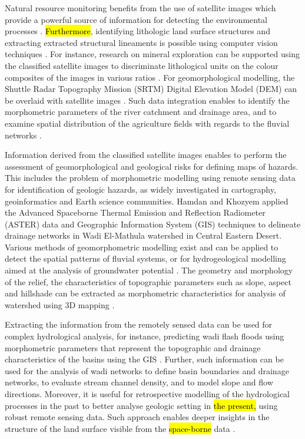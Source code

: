\documentclass[information,article,submit,pdftex,moreauthors]{Definitions/mdpi}
\begin{document}
Natural resource monitoring benefits from the use of satellite images which provide a powerful source of information for detecting the environmental processes \cite{Khafagy}. \hl{Furthermore}, identifying lithologic land surface structures and extracting extracted structural lineaments is possible using computer vision techniques \cite{Bishta,Kusky,Salman}. For instance, research on mineral exploration can be supported using the classified satellite images to discriminate lithological units on the colour composites of the images in various ratios \cite{Shalaby}. For geomorphological modelling, the Shuttle Radar Topography Mission (SRTM) Digital Elevation Model (DEM) can be overlaid with satellite images \cite{Liping}. Such data integration enables to identify the morphometric parameters of the river catchment and drainage area, and to examine spatial distribution of the agriculture fields with regards to the fluvial networks \cite{6265340}. 

Information derived from the classified satellite images enables to perform the assessment of geomorphological and geological risks for defining maps of hazards. This includes the problem of morphometric modelling using remote sensing data for identification of geologic hazards, as widely investigated in cartography, geoinformatics and Earth science communities. Hamdan and Khozyem \cite{Hamdan} applied the Advanced Spaceborne Thermal Emission and Reflection Radiometer (ASTER) data and Geographic Information System (GIS) techniques to delineate drainage networks in Wadi El-Mathula watershed in Central Eastern Desert. Various methods of geomorphometric modelling exist and can be applied to detect the spatial patterns of fluvial systems, or for hydrogeological modelling aimed at the analysis of groundwater potential \cite{Issawi,Abdalla2020,Gaber}. The geometry and morphology of the relief, the characteristics of topographic parameters such as slope, aspect and hillshade can be extracted as morphometric characteristics for analysis of watershed using 3D mapping \cite{Lemenkova202301}. 

Extracting the information from the remotely sensed data can be used for complex hydrological analysis, for instance, predicting wadi flash floods using morphometric parameters that represent the topographic and drainage characteristics of the basins using the GIS \cite{w9070553}. Further, such information can be used for the analysis of wadi networks to define basin boundaries and drainage networks, to evaluate stream channel density, and to model slope and flow directions. Moreover, it is useful for retrospective modelling of the hydrological processes in the past to better analyse geologic setting in \hl{the present, } using robust remote sensing data. Such approach enables deeper insights in the structure of the land surface visible from the \hl{space-borne } data \cite{abdelkareem2013integration,AbdelkareemFarouk}. 
\end{document}
